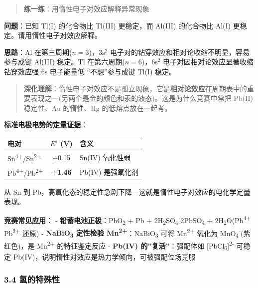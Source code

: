 \begin{quote}
\textbf{练一练}：用惰性电子对效应解释异常现象
\end{quote}

\textbf{问题}：已知 Tl(I) 的化合物比 Tl(III) 更稳定，而 Al(III) 的化合物比 Al(I) 更稳定。请用惰性电子对效应解释。

\textbf{思路}：Al 在第三周期(\(n=3\))，\(3\mathrm{s}^2\) 电子对的钻穿效应和相对论收缩不明显，容易参与成键 \箭 Al(III) 稳定。Tl 在第六周期(\(n=6\))，\(6\mathrm{s}^2\) 电子对因相对论效应显著收缩 \箭 钻穿效应强 \箭 6s 电子能量低 \箭 ``不想''参与成键 \箭 Tl(I) 稳定。

\begin{quote}
\textbf{深化理解}：惰性电子对效应不是孤立现象，它是\textbf{相对论效应}在周期表中的重要表现之一(另两个是金的颜色和汞的液态)。这是为什么竞赛中常把 Pb(II) 稳定性、Au 的惰性、Hg 的低熔点放在一起考。
\end{quote}

\textbf{标准电极电势的定量证据}：

{\def\LTcaptype{none} %
\begin{longtable}[]{@{}lcl@{}}
\toprule\noalign{}
电对 & \(E^\circ\) (V) & 含义 \\
\midrule\noalign{}
\endhead
\bottomrule\noalign{}
\endlastfoot
Sn\textsuperscript{4+}/Sn\textsuperscript{2+} & +0.15 & Sn(IV) 氧化性弱 \\
Pb\textsuperscript{4+}/Pb\textsuperscript{2+} & \textbf{+1.46} & Pb(IV) 是强氧化剂 \\
\end{longtable}
}

从 Sn 到 Pb，高氧化态的稳定性急剧下降---这就是惰性电子对效应的电化学定量表现。

\textbf{竞赛常见应用}：
- \textbf{铅蓄电池正极}：PbO\textsubscript{2} + Pb + 2H\textsubscript{2}SO\textsubscript{4} \箭 2PbSO\textsubscript{4} + 2H\textsubscript{2}O(Pb\textsuperscript{4+} \箭 Pb\textsuperscript{2+} 还原)
- \textbf{NaBiO\textsubscript{3} 定性检验 Mn\textsuperscript{2+}}：NaBiO\textsubscript{3} 可将 Mn\textsuperscript{2+} 氧化为 MnO\textsubscript{4}\textsuperscript{-}(紫红色)，是 Mn\textsuperscript{2+} 的特征鉴定反应
- \textbf{Pb(IV) 的''复活''}：强配体如 {[}PbCl\textsubscript{6}{]}\textsuperscript{2-} 可稳定 Pb(IV)，说明惰性对效应是热力学倾向，可被强配位场克服

\subsubsection{3.4 氢的特殊性}\label{ux6c22ux7684ux7279ux6b8aux6027}

